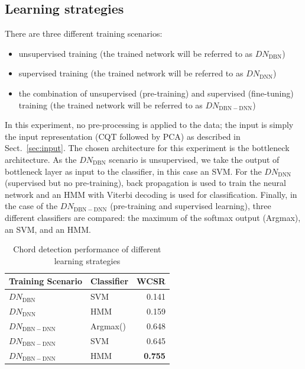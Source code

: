 \documentclass{article}
\begin{document}
\subsection{Learning strategies}
There are three different training scenarios:
\begin{itemize}
	\item   unsupervised training (the trained network will be referred to as $DN_\mathrm{DBN}$)
	\item   supervised training (the trained network will be referred to as $DN_\mathrm{DNN}$)
    \item   the combination of unsupervised (pre-training) and supervised (fine-tuning) training  (the trained network will be referred to as $DN_\mathrm{DBN-DNN}$)
\end{itemize} 
In this experiment, no pre-processing is applied to the data; the input is simply the input representation (CQT followed by PCA) as described in Sect.~\ref{sec:input}. The chosen architecture for this experiment is the bottleneck architecture.
As the $DN_\mathrm{DBN}$ scenario is unsupervised, we take the output of bottleneck layer as input to the classifier, in this case an SVM. For the $DN_\mathrm{DNN}$ (supervised but no pre-training), back propagation is used to train the neural network and an HMM with Viterbi decoding is used for classification. Finally, in the case of the $DN_\mathrm{DBN-DNN}$ (pre-training and supervised learning), three different classifiers are compared: the maximum of the softmax output (Argmax), an SVM, and an HMM. 
\begin{table}
\centering
\begin{tabular*}{\columnwidth}{@{\extracolsep{\fill}}llr}
\toprule
\textbf{Training Scenario} & \textbf{Classifier} & \textbf{WCSR}  \\ \hline
$DN_\mathrm{DBN}$             & SVM            & 0.141 \\ 
$DN_\mathrm{DNN}$              & HMM            & 0.159      \\ 
$DN_\mathrm{DBN-DNN}$         & Argmax()            & 0.648 \\ 
$DN_\mathrm{DBN-DNN}$          & SVM            & 0.645 \\ 
$DN_\mathrm{DBN-DNN}$         &  HMM           & \textbf{0.755} \\ \hline
\end{tabular*}
\caption{Chord detection performance of different learning strategies}
\label{dbn-dnn}
\end{table}
\end{document}
